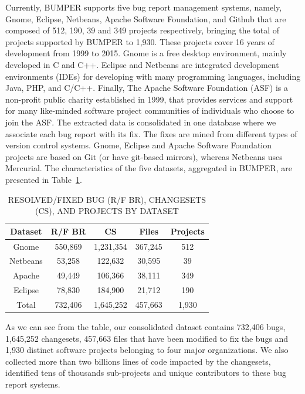 \documentclass[conference]{IEEEtran}
\begin{document}
Currently, BUMPER supports five bug report management systems, namely, Gnome, Eclipse, Netbeans, Apache Software Foundation, and Github that are composed of 512, 190, 39 and 349 projects respectively, bringing the total of projects supported by BUMPER to 1,930. These projects cover 16 years of development from 1999 to 2015.
Gnome is a free desktop environment, mainly developed in C and C++. Eclipse and Netbeans are integrated development environments (IDEs) for developing with many programming languages, including Java, PHP, and C/C++. Finally, The Apache Software Foundation (ASF) is a non-profit public charity established in 1999, that provides services and support for many like-minded software project communities of individuals who choose to join the ASF.
The extracted data is consolidated in one database where we associate each bug report with its fix.
The fixes are mined from different types of version control systems. Gnome, Eclipse and Apache Software Foundation projects are based on Git (or have git-based mirrors), whereas Netbeans uses Mercurial.
The characteristics of the five datasets, aggregated in BUMPER,  are presented in Table~\ref{tab:summary}.


\begin{table}[]
\centering
\caption{
RESOLVED/FIXED BUG (R/F BR),  CHANGESETS (CS), AND
PROJECTS BY DATASET}
\label{tab:summary}
\begin{tabular}{c|c|c|c|c}
\textbf{Dataset} & \textbf{R/F BR} & \textbf{CS} & \textbf{Files} & \textbf{Projects} \\ \hline \hline
Gnome            & 550,869         & 1,231,354   & 367,245        & 512                \\ \hline
Netbeans         & 53,258          & 122,632     & 30,595         & 39                \\ \hline
Apache           & 49,449          & 106,366     & 38,111         & 349               \\ \hline
Eclipse          & 78,830          & 184,900     & 21,712         & 190                \\ \hline \hline
Total            & 732,406         & 1,645,252   & 457,663        & 1,930               \\ \hline \hline
\end{tabular}
\vspace{-2.5em}
\end{table}

As we can see from the table, our consolidated dataset contains 732,406 bugs, 1,645,252 changesets, 457,663 files that have been modified to fix the bugs and 1,930 distinct software projects belonging to four major organizations.
We also collected more than two billions lines of code impacted by the changesets, identified tens of thousands sub-projects and unique contributors to these bug report systems.
\end{document}
